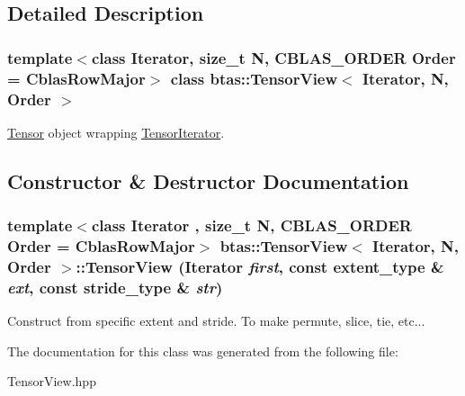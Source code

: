 \subsection{Detailed Description}
\subsubsection*{template$<$class Iterator, size\_\-t N, CBLAS\_\-ORDER Order = CblasRowMajor$>$ class btas::TensorView$<$ Iterator, N, Order $>$}

\hyperlink{classbtas_1_1_tensor}{Tensor} object wrapping \hyperlink{classbtas_1_1_tensor_iterator}{TensorIterator}. 

\subsection{Constructor \& Destructor Documentation}
\hypertarget{classbtas_1_1_tensor_view_a028fd76cdf15bf5d7cfe8fd4b89ff907}{
\subsubsection[{TensorView}]{\setlength{\rightskip}{0pt plus 5cm}template$<$class Iterator , size\_\-t N, CBLAS\_\-ORDER Order = CblasRowMajor$>$ {\bf btas::TensorView}$<$ Iterator, N, Order $>$::{\bf TensorView} (Iterator {\em first}, \/  const extent\_\-type \& {\em ext}, \/  const stride\_\-type \& {\em str})}}
\label{classbtas_1_1_tensor_view_a028fd76cdf15bf5d7cfe8fd4b89ff907}
Construct from specific extent and stride. To make permute, slice, tie, etc... 

The documentation for this class was generated from the following file:\begin{DoxyCompactItemize}
\item 
TensorView.hpp\end{DoxyCompactItemize}
